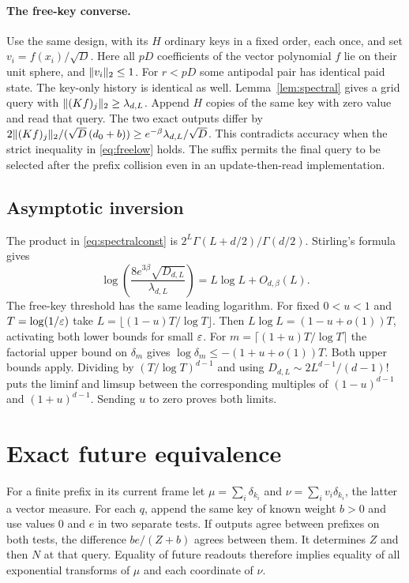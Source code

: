 \paragraph{The free-key converse.}
Use the same design, with its $H$ ordinary keys in a fixed order, each once, and set $v_i=f(x_i)/\sqrt D$. Here all $pD$ coefficients of the vector polynomial $f$ lie on their unit sphere, and $\lVert v_i\rVert_2\le1$. For $r<pD$ some antipodal pair has identical paid state. The key-only history is identical as well. Lemma~\ref{lem:spectral} gives a grid query with $\lVert (Kf)_j\rVert_2\ge\lambda_{d,L}$. Append $H$ copies of the same key with zero value and read that query. The two exact outputs differ by
$2\lVert (Kf)_j\rVert_2/(\sqrt D\,(d_0+b))\ge e^{-\beta}\lambda_{d,L}/\sqrt D$.
This contradicts accuracy when the strict inequality in \eqref{eq:freelow} holds. The suffix permits the final query to be selected after the prefix collision even in an update-then-read implementation.

\subsection{Asymptotic inversion}\label{sec:limit}
The product in \eqref{eq:spectralconst} is $2^L\Gamma(L+d/2)/\Gamma(d/2)$. Stirling's formula gives
\[
 \log\!\left(\frac{8e^{3\beta}\sqrt{D_{d,L}}}{\lambda_{d,L}}\right)
 =L\log L+O_{d,\beta}(L).
\]
The free-key threshold has the same leading logarithm. For fixed $0<u<1$ and $T=\log(1/\varepsilon)$ take $L=\lfloor(1-u)T/\log T\rfloor$. Then $L\log L=(1-u+o(1))T$, activating both lower bounds for small $\varepsilon$. For $m=\lceil(1+u)T/\log T\rceil$ the factorial upper bound on $\delta_m$ gives $\log\delta_m\le-(1+u+o(1))T$. Both upper bounds apply. Dividing by $(T/\log T)^{d-1}$ and using $D_{d,L}\sim2L^{d-1}/(d-1)!$ puts the liminf and limsup between the corresponding multiples of $(1-u)^{d-1}$ and $(1+u)^{d-1}$. Sending $u$ to zero proves both limits.

\section{Exact future equivalence}\label{sec:exact}
For a finite prefix in its current frame let $\mu=\sum_i\delta_{k_i}$ and $\nu=\sum_i v_i\delta_{k_i}$, the latter a vector measure. For each $q$, append the same key of known weight $b>0$ and use values $0$ and $e$ in two separate tests. If outputs agree between prefixes on both tests, the difference $be/(Z+b)$ agrees between them. It determines $Z$ and then $N$ at that query. Equality of future readouts therefore implies equality of all exponential transforms of $\mu$ and each coordinate of $\nu$.

